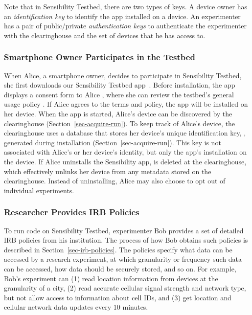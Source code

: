 Note that in Sensibility Testbed, there are two types of keys. A device
owner has an \textit{identification key} to identify the app installed on a 
device. An experimenter has a pair of public/private \textit{authentication 
keys} to authenticate the experimenter with the clearinghouse and 
the set of devices that he has access to.

\subsubsection{Smartphone Owner Participates in the Testbed}
\label{sec-owner-participate}

When Alice, a smartphone owner, decides to participate in
Sensibility Testbed, she first downloads our Sensibility Testbed
app~\cite{sensibility-app}. %
Before installation, the app displays a
consent form to Alice , where she can review
the testbed's general usage policy . If Alice
agrees to the terms and policy, the app will be installed on her
device. When the app is started, Alice's device can be
discovered by the clearinghouse (Section~\ref{sec-acquire-run}). 
To keep track of Alice's device, the
clearinghouse uses a database that stores her device's unique
identification key, , generated during installation 
(Section~\ref{sec-acquire-run}). This key is not associated with Alice's or her
device's identity, but only the app's installation on the device. If
Alice uninstalls the Sensibility app,  is
deleted at the clearinghouse, which effectively unlinks
her device from any metadata stored on the clearinghouse.
Instead of uninstalling, Alice may also choose to opt out of
individual experiments.

\subsubsection{Researcher Provides IRB
Policies}\label{sec-irb-policy}

To run code on Sensibility Testbed, experimenter Bob provides a
set of detailed IRB policies from his institution. The process of how
Bob obtains such policies is described in Section~\ref{sec-irb-policies}.
The policies specify 
what data can be accessed by a research experiment, at which 
granularity or frequency such data can be accessed, how data 
should be securely stored, and so on. 
For example, Bob's experiment can (1) read location information
from devices at the granularity of a city, (2) read accurate
cellular signal strength and network type, but not allow access to 
information about cell IDs, and (3) get location and
cellular network data updates every 10 minutes. 

